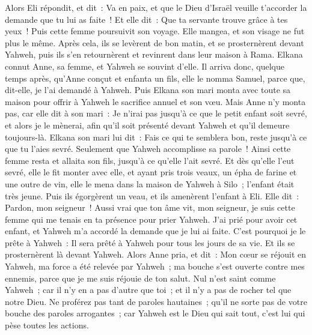 \begin{multicols}{2}
Alors Eli répondit, et dit~: Va en paix, et que le Dieu d'Israël veuille t'accorder la demande que tu lui as faite~!
Et elle dit~: Que ta servante trouve grâce à tes yeux~! Puis cette femme poursuivit son voyage. Elle mangea, et son visage ne fut plus le même.
Après cela, ils se levèrent de bon matin, et se prosternèrent devant Yahweh, puis ils s'en retournèrent et revinrent dans leur maison à Rama. Elkana connut Anne, sa femme, et Yahweh se souvint d'elle.
Il arriva donc, quelque temps après, qu'Anne conçut et enfanta un fils, elle le nomma Samuel, parce que, dit-elle, je l'ai demandé à Yahweh.
Puis Elkana son mari monta avec toute sa maison pour offrir à Yahweh le sacrifice annuel et son vœu.
Mais Anne n'y monta pas, car elle dit à son mari~: Je n'irai pas jusqu'à ce que le petit enfant soit sevré, et alors je le mènerai, afin qu'il soit présenté devant Yahweh et qu'il demeure toujours-là.
Elkana son mari lui dit~: Fais ce qui te semblera bon, reste jusqu'à ce que tu l'aies sevré. Seulement que Yahweh accomplisse sa parole~! Ainsi cette femme resta et allaita son fils, jusqu'à ce qu'elle l'ait sevré.
Et dès qu'elle l'eut sevré, elle le fit monter avec elle, et ayant pris trois veaux, un épha de farine et une outre de vin, elle le mena dans la maison de Yahweh à Silo~; l'enfant était très jeune.
Puis ils égorgèrent un veau, et ils amenèrent l'enfant à Eli.
Elle dit~: Pardon, mon seigneur~! Aussi vrai que ton âme vit, mon seigneur, je suis cette femme qui me tenais en ta présence pour prier Yahweh.
J'ai prié pour avoir cet enfant, et Yahweh m'a accordé la demande que je lui ai faite.
C'est pourquoi je le prête à Yahweh~: Il sera prêté à Yahweh pour tous les jours de sa vie. Et ils se prosternèrent là devant Yahweh.
\VerseOne{}Alors Anne pria, et dit~: Mon cœur se réjouit en Yahweh, ma force a été relevée par Yahweh~; ma bouche s'est ouverte contre mes ennemis, parce que je me suis réjouie de ton salut.
Nul n'est saint comme Yahweh~; car il n'y en a pas d'autre que toi~; et il n'y a pas de rocher tel que notre Dieu.
Ne proférez pas tant de paroles hautaines~; qu'il ne sorte pas de votre bouche des paroles arrogantes~; car Yahweh est le Dieu qui sait tout, c'est lui qui pèse toutes les actions.

\end{multicols}
